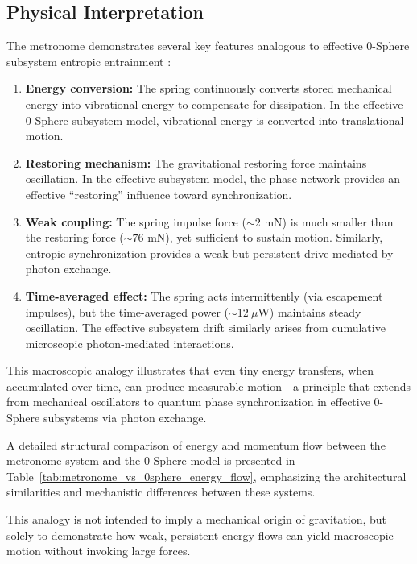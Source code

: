 \documentclass[%
 reprint,
 amsmath,amssymb,
 aps,
 prb,
]{revtex4-2}
\numberwithin{equation}{section}
\begin{document}
\subsection{Physical Interpretation}
\label{app:interpretation}

The metronome demonstrates several key features analogous to effective 0-Sphere subsystem entropic entrainment \cite{Bennett2002,Pikovsky2001}:

\begin{enumerate}
\item \textbf{Energy conversion:} The spring continuously converts stored mechanical energy into vibrational energy to compensate for dissipation. In the effective 0-Sphere subsystem model, vibrational energy is converted into translational motion.

\item \textbf{Restoring mechanism:} The gravitational restoring force maintains oscillation. In the effective subsystem model, the phase network provides an effective ``restoring'' influence toward synchronization.

\item \textbf{Weak coupling:} The spring impulse force ($\sim 2$ mN) is much smaller than the restoring force ($\sim 76$ mN), yet sufficient to sustain motion. Similarly, entropic synchronization provides a weak but persistent drive mediated by photon exchange.

\item \textbf{Time-averaged effect:} The spring acts intermittently (via escapement impulses), but the time-averaged power ($\sim 12~\mu$W) maintains steady oscillation. The effective subsystem drift similarly arises from cumulative microscopic photon-mediated interactions.
\end{enumerate}

This macroscopic analogy illustrates that even tiny energy transfers, when accumulated over time, can produce measurable motion—a principle that extends from mechanical oscillators to quantum phase synchronization in effective 0-Sphere subsystems via photon exchange.

A detailed structural comparison of energy and momentum flow between the metronome system and the 0-Sphere model is presented in Table~\ref{tab:metronome_vs_0sphere_energy_flow}, emphasizing the architectural similarities and mechanistic differences between these systems.

This analogy is not intended to imply a mechanical origin of gravitation, but solely to demonstrate how weak, persistent energy flows can yield macroscopic motion without invoking large forces.
\end{document}
